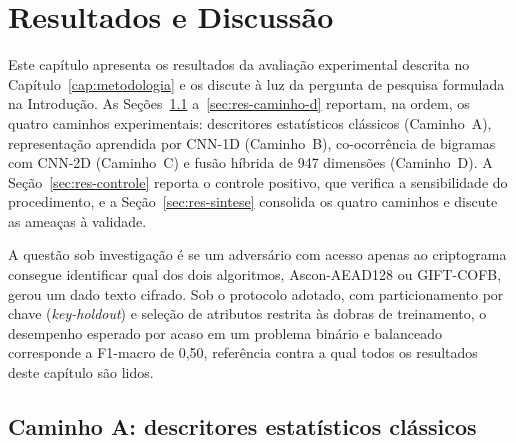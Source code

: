
\chapter{Resultados e Discussão}
\label{cap:resultados}

Este capítulo apresenta os resultados da avaliação experimental descrita no Capítulo~\ref{cap:metodologia} e os discute à luz da pergunta de pesquisa formulada na Introdução. As Seções~\ref{sec:res-caminho-a} a~\ref{sec:res-caminho-d} reportam, na ordem, os quatro caminhos experimentais: descritores estatísticos clássicos (Caminho~A), representação aprendida por CNN-1D (Caminho~B), co-ocorrência de bigramas com CNN-2D (Caminho~C) e fusão híbrida de 947 dimensões (Caminho~D). A Seção~\ref{sec:res-controle} reporta o controle positivo, que verifica a sensibilidade do procedimento, e a Seção~\ref{sec:res-sintese} consolida os quatro caminhos e discute as ameaças à validade.

A questão sob investigação é se um adversário com acesso apenas ao criptograma consegue identificar qual dos dois algoritmos, Ascon-AEAD128 ou GIFT-COFB, gerou um dado texto cifrado. Sob o protocolo adotado, com particionamento por chave (\textit{key-holdout}) e seleção de atributos restrita às dobras de treinamento, o desempenho esperado por acaso em um problema binário e balanceado corresponde a F1-macro de 0,50, referência contra a qual todos os resultados deste capítulo são lidos.

\section{Caminho A: descritores estatísticos clássicos}
\label{sec:res-caminho-a}

